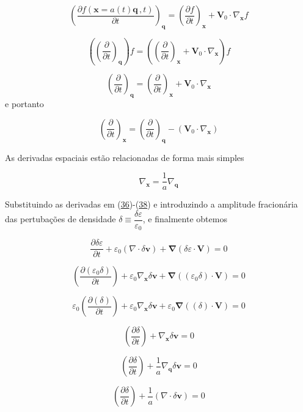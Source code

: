 \documentclass[a4paper,12pt]{article}
\begin{document}
$$\left( \dfrac{\partial f(\mathbf{x} = a(t)\mathbf{q}\, , t)}{\partial t} \right)_\mathbf{q} = \left( \dfrac{\partial f}{\partial t} \right)_\mathbf{x} + \mathbf{V}_0\cdot\nabla_\mathbf{x} f$$

$$\left(\left( \dfrac{\partial }{\partial t} \right)_\mathbf{q}\right)f =\left(\left( \dfrac{\partial }{\partial t} \right)_\mathbf{x} + \mathbf{V}_0\cdot\nabla_\mathbf{x}\right)  f$$

$$\left( \dfrac{\partial }{\partial t} \right)_\mathbf{q} =\left( \dfrac{\partial }{\partial t} \right)_\mathbf{x} + \mathbf{V}_0\cdot\nabla_\mathbf{x}$$
e portanto

\begin{equation}\label{eq41}
	\left(\dfrac{\partial}{\partial t}\right)_\mathbf{x} = \left( \dfrac{\partial}{\partial t} \right)_\mathbf{q} - (\mathbf{V}_0 \cdot \nabla_\mathbf{x})
\end{equation}

As derivadas espaciais estão relacionadas de forma mais simples

\begin{equation}\label{eq42}
	\nabla_\mathbf{x} = \dfrac{1}{a}\nabla_\mathbf{q}
\end{equation}

Substituindo as derivadas em (\hyperref[eq36]{36})-(\hyperref[eq38]{38}) e introduzindo a amplitude fracionária das pertubações de densidade $\delta\equiv\dfrac{\delta\varepsilon}{\varepsilon_0}$, e finalmente obtemos

$$\dfrac{\partial\delta\varepsilon}{\partial t} + \varepsilon_0(\nabla\cdot\delta\mathbf{v})+\mathbf{\nabla} (\delta\varepsilon \cdot \mathbf{V}) = 0$$

$$\left(\dfrac{\partial(\varepsilon_0\delta)}{\partial t}\right) + \varepsilon_0\nabla_\mathbf{x}\delta\mathbf{v}+\mathbf{\nabla} ((\varepsilon_0\delta) \cdot \mathbf{V}) = 0$$

$$\varepsilon_0\left(\dfrac{\partial(\delta)}{\partial t}\right) + \varepsilon_0\nabla_\mathbf{x}\delta\mathbf{v}+\varepsilon_0\mathbf{\nabla} ((\delta) \cdot \mathbf{V}) = 0$$

$$\left(\dfrac{\partial\delta}{\partial t}\right) + \nabla_\mathbf{x}\delta\mathbf{v} = 0$$

$$\left(\dfrac{\partial\delta}{\partial t}\right) + \dfrac{1}{a}\nabla_\mathbf{q}\delta\mathbf{v} = 0$$

\begin{equation}\label{eq43}
	\left( \dfrac{\partial \delta}{\partial t} \right) + \dfrac{1}{a}(\nabla\cdot\delta\mathbf{v}) = 0
\end{equation}
\newline
\end{document}
